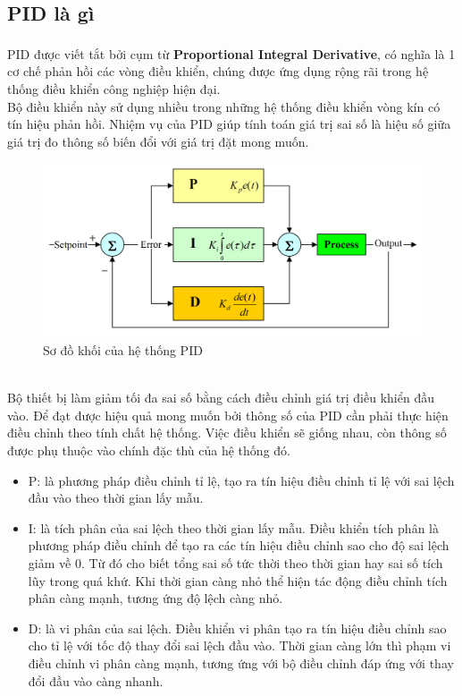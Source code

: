 \subsection{PID là gì}
\tab PID\textsuperscript{\cite{pid}} được viết tắt bởi cụm từ \textbf{Proportional Integral Derivative}, có nghĩa là 1 cơ chế phản hồi các vòng điều khiển, chúng được ứng dụng rộng rãi trong hệ thống điều khiển công nghiệp hiện đại.\\
\tab Bộ điều khiển này sử dụng nhiều trong những hệ thống điều khiển vòng kín có tín hiệu phản hồi. Nhiệm vụ của PID giúp tính toán giá trị sai số là hiệu số giữa giá trị đo thông số biến đổi với giá trị đặt mong muốn.\\
\begin{figure}[!hbt]
\begin{center}
    \includegraphics[width=14cm]{img/2_Theory/pid.png}
    \caption{Sơ đồ khối của hệ thống PID}
\end{center}
\end{figure}
\\
\tab Bộ thiết bị làm giảm tối đa sai số bằng cách điều chỉnh giá trị điều khiển đầu vào. Để đạt được hiệu quả mong muốn bởi thông số của PID cần phải thực hiện điều chỉnh theo tính chất hệ thống. Việc điều khiển sẽ giống nhau, còn thông số được phụ thuộc vào chính đặc thù của hệ thống đó.

\begin{itemize}
    \item P: là phương pháp điều chỉnh tỉ lệ, tạo ra tín hiệu điều chỉnh tỉ lệ với sai lệch đầu vào theo thời gian lấy mẫu.
    \item I: là tích phân của sai lệch theo thời gian lấy mẫu. Điều khiển tích phân là phương pháp điều chỉnh để tạo ra các tín hiệu điều chỉnh sao cho độ sai lệch giảm về 0. Từ đó cho biết tổng sai số tức thời theo thời gian hay sai số tích lũy trong quá khứ. Khi thời gian càng nhỏ thể hiện tác động điều chỉnh tích phân càng mạnh, tương ứng độ lệch càng nhỏ.
    \item D: là vi phân của sai lệch. Điều khiển vi phân tạo ra tín hiệu điều chỉnh sao cho tỉ lệ với tốc độ thay đổi sai lệch đầu vào. Thời gian càng lớn thì phạm vi điều chỉnh vi phân càng mạnh, tương ứng với bộ điều chỉnh đáp ứng với thay đổi đầu vào càng nhanh.
\end{itemize}
